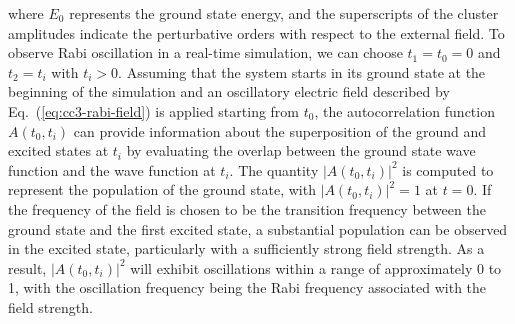 where $E_{0}$ represents the ground state energy, and the superscripts of the cluster amplitudes indicate the perturbative orders with respect to the external field. To observe Rabi oscillation in a real-time simulation, we can choose $t_{1}=t_{0}=0$ and $t_{2}=t_{i}$ with $t_{i} > 0$. Assuming that the system starts in its ground state at the beginning of the simulation and an oscillatory electric field described by Eq.~(\ref{eq:cc3-rabi-field}) is applied starting from $t_{0}$, the autocorrelation function $A(t_{0}, t_{i})$ can provide information about the superposition of the ground and excited states at $t_{i}$ by evaluating the overlap between the ground state wave function and the wave function at $t_{i}$. The quantity $|A(t_{0}, t_{i})|^{2}$ is computed to represent the population of the ground state, with $|A(t_{0}, t_{i})|^{2}=1$ at $t=0$. If the frequency of the field is chosen to be the transition frequency between the ground state and the first excited state, a substantial population can be observed in the excited state, particularly with a sufficiently strong field strength. As a result, $|A(t_{0}, t_{i})|^{2}$ will exhibit oscillations within a range of approximately 0 to 1, with the oscillation frequency being the Rabi frequency associated with the field strength.                                                                                                                                                      
